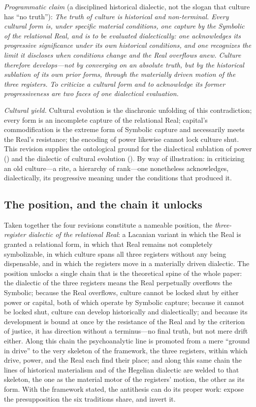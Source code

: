 \emph{Programmatic claim} (a disciplined historical dialectic, not the slogan that culture has ``no truth''): {\itshape The truth of culture is historical and non-terminal. Every cultural form is, under specific material conditions, one capture by the Symbolic of the relational Real, and is to be evaluated dialectically: one acknowledges its progressive significance under its own historical conditions, and one recognizes the limit it discloses when conditions change and the Real overflows anew. Culture therefore develops---not by converging on an absolute truth, but by the historical sublation of its own prior forms, through the materially driven motion of the three registers. To criticize a cultural form and to acknowledge its former progressiveness are two faces of one dialectical evaluation.}

\emph{Cultural yield.} Cultural evolution is the diachronic unfolding of this contradiction; every form is an incomplete capture of the relational Real; capital's commodification is the extreme form of Symbolic capture and necessarily meets the Real's resistance; the encoding of power likewise cannot lock culture shut. This revision supplies the ontological ground for the dialectical sublation of power () and the dialectic of cultural evolution (). By way of illustration: in criticizing an old culture---a rite, a hierarchy of rank---one nonetheless acknowledges, dialectically, its progressive meaning under the conditions that produced it.

\subsection*{The position, and the chain it unlocks}

Taken together the four revisions constitute a nameable position, the \emph{three-register dialectic of the relational Real}: a Lacanian variant in which the Real is granted a relational form, in which that Real remains not completely symbolizable, in which culture spans all three registers without any being dispensable, and in which the registers move in a materially driven dialectic. The position unlocks a single chain that is the theoretical spine of the whole paper: the dialectic of the three registers means the Real perpetually overflows the Symbolic; because the Real overflows, culture cannot be locked shut by either power or capital, both of which operate by Symbolic capture; because it cannot be locked shut, culture can develop historically and dialectically; and because its development is bound at once by the resistance of the Real and by the criterion of justice, it has direction without a terminus---no final truth, but not mere drift either. Along this chain the psychoanalytic line is promoted from a mere ``ground in drive'' to the very skeleton of the framework, the three registers, within which drive, power, and the Real each find their place; and along this same chain the lines of historical materialism and of the Hegelian dialectic are welded to that skeleton, the one as the material motor of the registers' motion, the other as its form. With the framework stated, the antithesis can do its proper work: expose the presupposition the six traditions share, and invert it.
